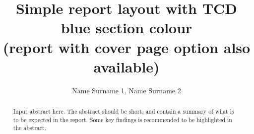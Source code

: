 \documentclass[a4paper]{article}
\begin{document}
\title{Simple report layout with TCD blue section colour \\ (report with cover page option also available)}
\author{Name Surname 1, Name Surname 2}
\maketitle

\begin{abstract}
    Input abstract here. The abstract should be short, and contain a summary of what is to be expected in the report. Some key findings is recommended to be highlighted in the abstract.
\end{abstract}









\end{document}
